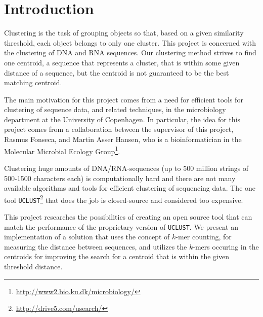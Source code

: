 \section{Introduction}
Clustering is the task of grouping objects so that, based on a given similarity
threshold, each object belongs to only one cluster.  This project is concerned
with the clustering of DNA and RNA sequences. Our clustering method strives to
find one centroid, a sequence that represents a cluster, that is within some
given distance of a sequence, but the centroid is not guaranteed to be the best
matching centroid.

The main motivation for this project comes from a need for efficient tools for
clustering of sequence data, and related techniques, in the microbiology
department at the University of Copenhagen. In particular, the idea for this
project comes from a collaboration between the supervisor of this project,
Rasmus Fonseca, and Martin Asser Hansen, who is a bioinformatician in the
Molecular Microbial Ecology
Group\footnote{\url{http://www2.bio.ku.dk/microbiology/}}.

Clustering huge amounts of DNA/RNA-sequences (up to 500 million strings of
500-1500 characters each) is computationally hard and there are not many
available algorithms and tools for efficient clustering of sequencing data. The
one tool \texttt{UCLUST}\footnote{\url{http://drive5.com/usearch/}} that does
the job is closed-source and considered too expensive.

This project researches the possibilities of creating an open source tool that
can match the performance of the proprietary version of \texttt{UCLUST}. We
present an implementation of a solution that uses the concept of $k$-mer
counting, for measuring the distance between sequences, and utilizes the
$k$-mers occuring in the centroids for improving the search for a centroid that
is within the given threshold distance.
